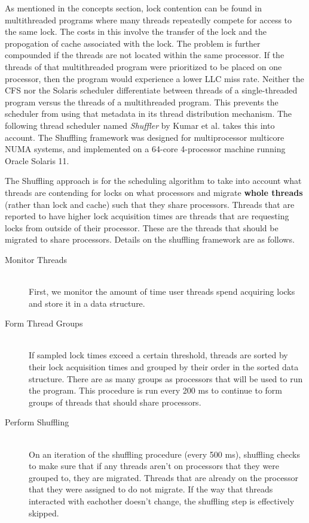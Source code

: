 \documentclass{sig-alternate}
\begin{document}
As mentioned in the concepts section, lock contention can be found in multithreaded programs where many threads repeatedly compete for access to the same lock. The costs in this involve the transfer of the lock and the propogation of cache associated with the lock. The problem is further compounded if the threads are not located within the same processor. If the threads of that multithreaded program were prioritized to be placed on one processor, then the program would experience a lower LLC miss rate. Neither the CFS nor the Solaris scheduler differentiate between threads of a single-threaded program versus the threads of a multithreaded program. This prevents the scheduler from using that metadata in its thread distribution mechanism. The following thread scheduler named \emph{Shuffler} by Kumar et al. takes this into account. The Shuffling framework was designed for multiprocessor multicore NUMA systems, and implemented on a 64-core 4-processor machine running Oracle Solaris 11.~\cite{Kumar:2014}

The Shuffling approach is for the scheduling algorithm to take into account what threads are contending for locks on what processors and migrate \textbf{whole threads} (rather than lock and cache) such that they share processors. Threads that are reported to have higher lock acquisition times are threads that are requesting locks from outside of their processor. These are the threads that should be migrated to share processors. Details on the shuffling framework are as follows.~\cite{Kumar:2014}

\begin{description}
\item [Monitor Threads] \ \\
First, we monitor the amount of time user threads spend acquiring locks and store it in a data structure. 

\item [Form Thread Groups] \ \\
If sampled lock times exceed a certain threshold, threads are sorted by their lock acquisition times and grouped by their order in the sorted data structure. There are as many groups as processors that will be used to run the program. This procedure is run every 200 ms to continue to form groups of threads that should share processors.

\item [Perform Shuffling] \ \\
On an iteration of the shuffling procedure (every 500 ms), shuffling checks to make sure that if any threads aren't on processors that they were grouped to, they are migrated. Threads that are already on the processor that they were assigned to do not migrate. If the way that threads interacted with eachother doesn't change, the shuffling step is effectively skipped.~\cite{Kumar:2014}
\end{description}
\end{document}
